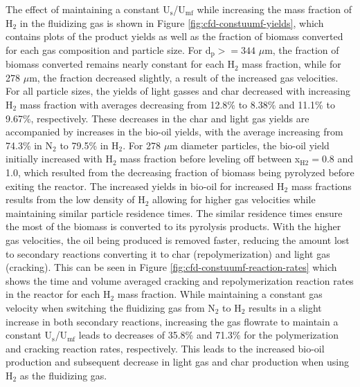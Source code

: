 The effect of maintaining a constant U$_\text{s}$/U$_\text{mf}$ while increasing the mass fraction of H$_2$ in the fluidizing gas is shown in Figure \ref{fig:cfd-constuumf-yields}, which contains plots of the product yields as well as the fraction of biomass converted for each gas composition and particle size. For d$_\text{p} >= 344$ $\mu$m, the fraction of biomass converted remains nearly constant for each H$_2$ mass fraction, while for 278 $\mu$m, the fraction decreased slightly, a result of the increased gas velocities. For all particle sizes, the yields of light gasses and char decreased with increasing H$_2$ mass fraction with averages decreasing from 12.8\% to 8.38\% and 11.1\% to 9.67\%, respectively. These decreases in the char and light gas yields are accompanied by increases in the bio-oil yields, with the average increasing from 74.3\% in N$_2$ to 79.5\% in H$_2$. For 278 $\mu$m diameter particles, the bio-oil yield initially increased with H$_2$ mass fraction before leveling off between x$_\text{H2} = 0.8$ and 1.0, which resulted from the decreasing fraction of biomass being pyrolyzed before exiting the reactor. The increased yields in bio-oil for increased H$_2$ mass fractions results from the low density of H$_2$ allowing for higher gas velocities while maintaining similar particle residence times. The similar residence times ensure the most of the biomass is converted to its pyrolysis products. With the higher gas velocities, the oil being produced is removed faster, reducing the amount lost to secondary reactions converting it to char (repolymerization) and light gas (cracking). This can be seen in Figure \ref{fig:cfd-constuumf-reaction-rates} which shows the time and volume averaged cracking and repolymerization reaction rates in the reactor for each H$_2$ mass fraction. While maintaining a constant gas velocity when switching the fluidizing gas from N$_2$ to H$_2$ results in a slight increase in both secondary reactions, increasing the gas flowrate to maintain a constant U$_\text{s}$/U$_\text{mf}$ leads to decreases of 35.8\% and 71.3\% for the polymerization and cracking reaction rates, respectively. This leads to the increased bio-oil production and subsequent decrease in light gas and char production when using H$_2$ as the fluidizing gas.

